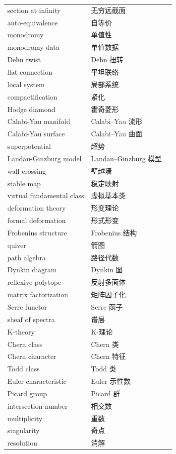 {\begin{longtable}{p{5.0cm}p{5.6cm}p{3.6cm}}
section at infinity & 无穷远截面 &  \\
auto-equivalence & 自等价 &  \\
monodromy & 单值性 &  \\
monodromy data & 单值数据 &  \\
Dehn twist & Dehn 扭转 &  \\
flat connection & 平坦联络 &  \\
local system & 局部系统 &  \\
compactification & 紧化 &  \\
Hodge diamond & 霍奇菱形 &  \\
Calabi-Yau manifold & Calabi–Yau 流形 &  \\
Calabi-Yau surface & Calabi–Yau 曲面 &  \\
superpotential & 超势 &  \\
Landau-Ginzburg model & Landau–Ginzburg 模型 &  \\
wall-crossing & 壁越墙 &  \\
stable map & 稳定映射 &  \\
virtual fundamental class & 虚拟基本类 &  \\
deformation theory & 形变理论 &  \\
formal deformation & 形式形变 &  \\
Frobenius structure & Frobenius 结构 &  \\
quiver & 箭图 &  \\
path algebra & 路径代数 &  \\
Dynkin diagram & Dynkin 图 &  \\
reflexive polytope & 反射多面体 &  \\
matrix factorization & 矩阵因子化 &  \\
Serre functor & Serre 函子 &  \\
sheaf of spectra & 谱层 &  \\
K-theory & K-理论 &  \\
Chern class & Chern 类 &  \\
Chern character & Chern 特征 &  \\
Todd class & Todd 类 &  \\
Euler characteristic & Euler 示性数 &  \\
Picard group & Picard 群 &  \\
intersection number & 相交数 &  \\
multiplicity & 重数 &  \\
singularity & 奇点 &  \\
resolution & 消解 &  \\

\end{longtable}}
